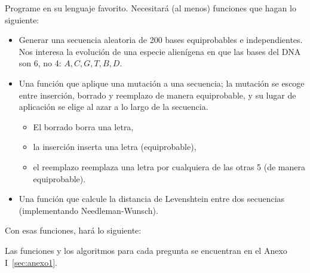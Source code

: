 Programe en su lenguaje favorito.
Necesitará (al menos) funciones que hagan lo siguiente:
\begin{itemize}
	\item Generar una secuencia aleatoria de 200 bases
		equiprobables e independientes.
		Nos interesa la evolución de una especie alienígena
		en que las bases del DNA son 6, no 4: $A,C,G,T,B,D$.

	\item Una función que aplique una mutación a una secuencia;
		la mutación se escoge entre inserción, borrado y reemplazo
		de manera equiprobable, y su lugar de aplicación se elige
		al azar a lo largo de la secuencia.

		\begin{itemize}
			\item El borrado borra una letra,
			\item la inserción inserta una letra (equiprobable),
			\item el reemplazo reemplaza una letra por cualquiera
				de las otras 5 (de manera equiprobable).
		\end{itemize}

	\item Una función que calcule la distancia de Levenshtein
		entre dos secuencias (implementando Needleman-Wunsch).
\end{itemize}

Con esas funciones, hará lo siguiente:

 Las funciones y los algoritmos para cada pregunta se encuentran en el Anexo I~\ref{sec:anexo1}.


